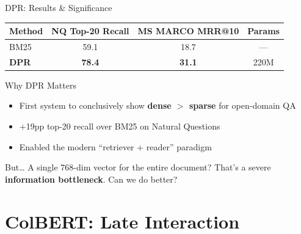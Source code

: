 \documentclass[aspectratio=169]{beamer}
\newif\ifanimated
\newcommand{\cpause}{\ifanimated\pause\fi}
\begin{document}
\begin{frame}{DPR: Results \& Significance}
\begin{center}
\begin{tabular}{lccc}
\toprule
\textbf{Method} & \textbf{NQ Top-20 Recall} & \textbf{MS MARCO MRR@10} & \textbf{Params} \\
\midrule
BM25 & 59.1 & 18.7 & --- \\
\textbf{DPR} & \textbf{78.4} & \textbf{31.1} & 220M \\
\bottomrule
\end{tabular}
\end{center}

\vspace{1em}

\begin{block}{Why DPR Matters}
\begin{itemize}
    \item First system to conclusively show \textbf{dense $>$ sparse} for open-domain QA
    \item +19pp top-20 recall over BM25 on Natural Questions
    \item Enabled the modern ``retriever + reader'' paradigm
\end{itemize}
\end{block}

\cpause
\vspace{0.5em}

\begin{alertblock}{But\ldots}
A single 768-dim vector for the entire document? That's a severe \textbf{information bottleneck}. Can we do better?
\end{alertblock}
\end{frame}

\section{ColBERT: Late Interaction}

\begin{frame}[plain]
\sectionpage
\end{frame}
\end{document}
